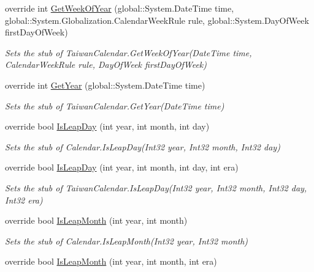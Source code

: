 \begin{DoxyCompactItemize}
override int \hyperlink{class_system_1_1_globalization_1_1_fakes_1_1_stub_taiwan_calendar_ad42025ce7de2af79224a0f418360f077}{Get\-Week\-Of\-Year} (global\-::\-System.\-Date\-Time time, global\-::\-System.\-Globalization.\-Calendar\-Week\-Rule rule, global\-::\-System.\-Day\-Of\-Week first\-Day\-Of\-Week)
\begin{DoxyCompactList}\small\item\em Sets the stub of Taiwan\-Calendar.\-Get\-Week\-Of\-Year(\-Date\-Time time, Calendar\-Week\-Rule rule, Day\-Of\-Week first\-Day\-Of\-Week)\end{DoxyCompactList}\item 
override int \hyperlink{class_system_1_1_globalization_1_1_fakes_1_1_stub_taiwan_calendar_aa4919a56d21a6bb7321d18123b66ab63}{Get\-Year} (global\-::\-System.\-Date\-Time time)
\begin{DoxyCompactList}\small\item\em Sets the stub of Taiwan\-Calendar.\-Get\-Year(\-Date\-Time time)\end{DoxyCompactList}\item 
override bool \hyperlink{class_system_1_1_globalization_1_1_fakes_1_1_stub_taiwan_calendar_a16d2e06b11fd05b1b84e8b3df274a726}{Is\-Leap\-Day} (int year, int month, int day)
\begin{DoxyCompactList}\small\item\em Sets the stub of Calendar.\-Is\-Leap\-Day(\-Int32 year, Int32 month, Int32 day)\end{DoxyCompactList}\item 
override bool \hyperlink{class_system_1_1_globalization_1_1_fakes_1_1_stub_taiwan_calendar_abb63fabd9e331a0f3d7f4726a0d423a7}{Is\-Leap\-Day} (int year, int month, int day, int era)
\begin{DoxyCompactList}\small\item\em Sets the stub of Taiwan\-Calendar.\-Is\-Leap\-Day(\-Int32 year, Int32 month, Int32 day, Int32 era)\end{DoxyCompactList}\item 
override bool \hyperlink{class_system_1_1_globalization_1_1_fakes_1_1_stub_taiwan_calendar_afbcfc489bcd745f93833f95afdc10e9e}{Is\-Leap\-Month} (int year, int month)
\begin{DoxyCompactList}\small\item\em Sets the stub of Calendar.\-Is\-Leap\-Month(\-Int32 year, Int32 month)\end{DoxyCompactList}\item 
override bool \hyperlink{class_system_1_1_globalization_1_1_fakes_1_1_stub_taiwan_calendar_a3c587f750f04fcbfc48719dc041d146b}{Is\-Leap\-Month} (int year, int month, int era)

\end{DoxyCompactItemize}
